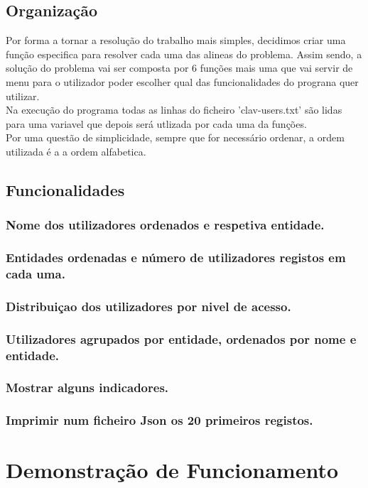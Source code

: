 \documentclass[11pt,a4paper]{report}%
\begin{document}
\section{Organização}
Por forma a tornar a resolução do trabalho mais simples, decidimos criar uma função especifica para resolver cada uma das alineas do problema. Assim sendo, a solução do problema vai ser composta por 6 funções mais uma que vai servir de menu para o utilizador poder escolher qual das funcionalidades do prograna quer utilizar.\\
Na execução do programa todas as linhas do ficheiro 'clav-users.txt' são lidas para uma variavel que depois será utlizada por cada uma da funções.\\
Por uma questão de simplicidade, sempre que for necessário ordenar, a ordem utilizada é a a ordem alfabetica.
\section{Funcionalidades}
\subsection{Nome dos utilizadores ordenados e respetiva entidade.}
\subsection{Entidades ordenadas e número de utilizadores registos em cada uma.}
\subsection{Distribuiçao dos utilizadores por nivel de acesso.}
\subsection{Utilizadores agrupados por entidade, ordenados por nome e entidade.}
\subsection{Mostrar alguns indicadores.}
\subsection{Imprimir num ficheiro Json os 20 primeiros registos.}


\chapter{Demonstração de Funcionamento}
\end{document}
